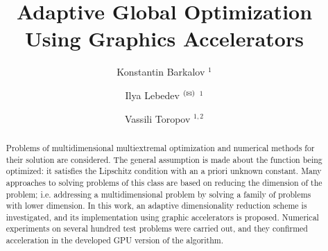 \documentclass{svproc}
\def\letter{$^{\textrm{(\Letter)}}$}
\begin{document}
\mainmatter              %
%
\title{Adaptive Global Optimization Using Graphics Accelerators
}
%
%
\author{
Konstantin Barkalov%
$^1$ \and
Ilya Lebedev \letter%
$^1$ \and 
Vassili Toropov%
$^{1,2}$
}

%
%
%


	
\maketitle              %

\begin{abstract}

Problems of multidimensional multiextremal optimization and numerical methods for their solution are considered. The general assumption is made about the function being optimized: it satisfies the Lipschitz condition with an a priori unknown constant. Many approaches to solving problems of this class are based on reducing the dimension of the problem; i.e. addressing a multidimensional problem by solving a family of problems with lower dimension. In this work, an adaptive dimensionality reduction scheme is investigated, and its implementation using graphic accelerators is proposed. Numerical experiments on several hundred test problems were carried out, and they confirmed acceleration in the developed GPU version of the algorithm.


\end{abstract}
\end{document}
